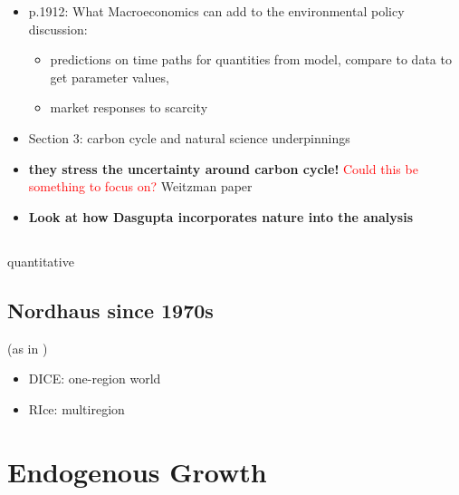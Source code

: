 \documentclass[12pt]{article}
\newcommand{\tr}[1]{\textcolor{red}{#1}}
\begin{document}
\begin{itemize}
\begin{itemize}
	 	\end{itemize}
\item p.1912: What Macroeconomics can add to the environmental policy discussion: 
 	\begin{itemize}
	\item predictions on time paths for quantities from model, compare to data to get parameter values, 
	\item market responses to scarcity
 	\end{itemize}
 \item Section 3: carbon cycle and natural science underpinnings
 \item \textbf{they stress the uncertainty around carbon cycle!} \tr{Could this be something to focus on?} Weitzman paper
 \item \textbf{Look at how Dasgupta incorporates nature into the analysis}
	 	
\end{itemize}
 \subsection{\cite{Acemoglu2016TransitionTechnology}} quantitative
 \subsection{\cite{Golosov2014OptimalEquilibrium}}
\subsection{Nordhaus since 1970s \citep{Nordhaus2018ProjectionsPolicies}} (as in \cite{Hassler2016EnvironmentalMacroeconomics})
\begin{itemize}
\item DICE: one-region world
\item RIce: multiregion
\end{itemize}

\section{Endogenous Growth}
\hypertarget{endgro}{}
\localtableofcontents
\end{document}

